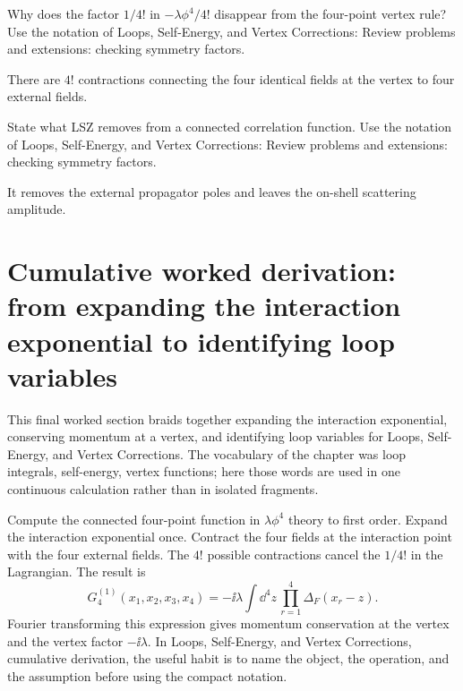 \begin{exercise}
Why does the factor \(1/4!\) in \(-\lambda\phi^4/4!\) disappear from the four-point vertex rule?  Use the notation of Loops, Self-Energy, and Vertex Corrections: Review problems and extensions: checking symmetry factors.
\begin{answer}
There are \(4!\) contractions connecting the four identical fields at the vertex to four external fields.
\end{answer}
\end{exercise}

\begin{exercise}
State what LSZ removes from a connected correlation function.  Use the notation of Loops, Self-Energy, and Vertex Corrections: Review problems and extensions: checking symmetry factors.
\begin{answer}
It removes the external propagator poles and leaves the on-shell scattering amplitude.
\end{answer}
\end{exercise}



\section{Cumulative worked derivation: from expanding the interaction exponential to identifying loop variables}

This final worked section braids together expanding the interaction exponential, conserving momentum at a vertex, and identifying loop variables for Loops, Self-Energy, and Vertex Corrections.  The vocabulary of the chapter was loop integrals, self-energy, vertex functions; here those words are used in one continuous calculation rather than in isolated fragments.

Compute the connected four-point function in \(\lambda\phi^4\) theory to first order.  Expand the interaction exponential once.  Contract the four fields at the interaction point with the four external fields.  The \(4!\) possible contractions cancel the \(1/4!\) in the Lagrangian.  The result is
\[
  G_4^{(1)}(x_1,x_2,x_3,x_4)=
  -\ii\lambda\int\dd^4z\,\prod_{r=1}^4\Delta_F(x_r-z).
\]
Fourier transforming this expression gives momentum conservation at the vertex and the vertex factor \(-\ii\lambda\).  In Loops, Self-Energy, and Vertex Corrections, cumulative derivation, the useful habit is to name the object, the operation, and the assumption before using the compact notation.

